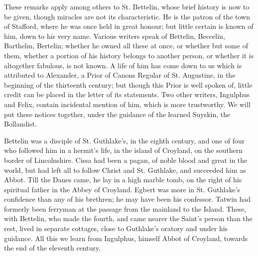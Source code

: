 These remarks apply among others to St. Bettelin,
whose brief history is now to be given, though miracles are not its
characteristic. He is the patron of the town of Stafford, where he was
once held in great honour; but little certain is known of him, down to
his very name. Various writers speak of Bettelin, Beccelin, Barthelm,
Bertelin; whether he owned all these at once, or whether but some of
them, whether a portion of his history belongs to another person, or
whether it is altogether fabulous, is not known. A life of him has
come down to us which is attributed to Alexander, a Prior of Canons
Regular of St. Augustine, in the beginning of the thirteenth century;
but though this Prior is well spoken of, little credit can be placed
in the letter of its statements. Two other writers, Ingulphus and
Felix, contain incidental mention of him, which is more trustworthy.
We will put these notices together, under the guidance of the learned
Suyskin, the Bollandist.

Bettelin was a disciple of St. Guthlake's, in the
eighth century, and one of four who followed him in a hermit's life,
in the island of Croyland, on the southern border of Lincolnshire.
Cissa had been a pagan, of noble blood and great in the world, but had
left all to follow Christ and St. Guthlake, and succeeded him as
Abbot. Till the Danes came, he lay in a high marble tomb, on the right
of his spiritual father in the Abbey of Croyland. Egbert was more in
St. Guthlake's confidence than any of his brethren; he may have
been his confessor. Tatwin had formerly been ferryman at the passage
from the mainland to the Island. These, with Bettelin, who made the
fourth, and came nearer the Saint's person than the rest, lived in
separate cottages, close to Guthlake's oratory and under his guidance.
All this we learn from Ingulphus, himself Abbot of Croyland, towards
the end of the eleventh century.

